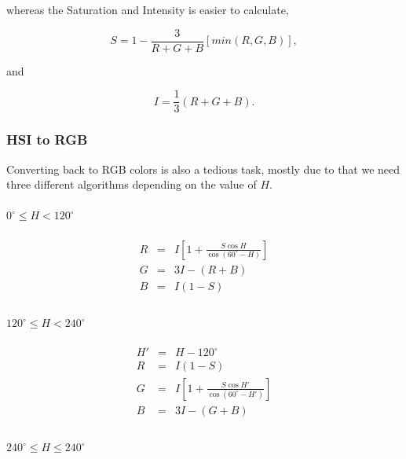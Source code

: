 whereas the Saturation and Intensity is easier to calculate,

\begin{equation}
S = 1- \frac{3}{R+G+B}\left[min(R,G,B)\right],
\end{equation}

and

\begin{equation}
I = \frac{1}{3}(R+G+B).
\end{equation}

\subsubsection{HSI to RGB}

Converting back to RGB colors is also a tedious task, mostly due to that we need three different algorithms depending on the value of $H$.

\paragraph*{$0^{\circ} \leq H < 120^{\circ}$}

\begin{equation}
\begin{array}{lcl}
R & = & I \left[1+\frac{S\cos{H}}{\cos{(60^{\circ}-H)}}\right] \\
G & = & 3I -(R+B) \\
B & = & I(1-S) \\
\end{array}
\end{equation}

\paragraph*{$120^{\circ} \leq H < 240^{\circ}$}

\begin{equation}
	\begin{array}{lcl}
		H' & = & H-120^{\circ}\\
		R & = & I(1-S)\\
		G & = & I \left[1+\frac{S\cos{H'}}{\cos{(60^{\circ}-H')}}\right]\\
		B & = & 3I -(G+B)\\
	\end{array}
\end{equation}

\paragraph*{$240^{\circ} \leq H \leq 240^{\circ}$}

